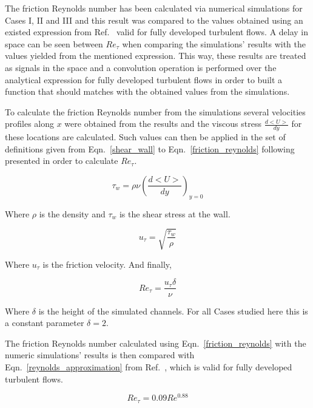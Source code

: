 \documentclass[twocolumn,10pt]{asme2e}
\begin{document}
The friction Reynolds number has been calculated via numerical simulations for Cases I, II and III and this result was compared to the values obtained using an existed expression from Ref.~\cite{pope} valid for fully developed turbulent flows. A delay in space can be seen between \(Re_{\tau}\) when comparing the simulations' results with the values yielded from the mentioned expression. This way, these results are treated as signals in the space and a convolution operation is performed over the analytical expression for fully developed turbulent flows in order to built a function that should matches with the obtained values from the simulations.

To calculate the friction Reynolds number from the simulations several velocities profiles along \(x\) were obtained from the results and the viscous stress \(\frac{d<U>}{dy}\) for these locations are calculated. Such values can then be applied in the set of definitions given from Eqn.~\ref{shear_wall} to Eqn.~\ref{friction_reynolds} following presented in order to calculate \(Re_{\tau}\).

\begin{equation}
{\tau}_w = \rho\nu\left(\frac{d<U>}{dy}\right)_{y=0}
\label{shear_wall}
\end{equation}

Where \(\rho\) is the density and \({\tau}_w\)  is the shear stress at the wall.

\begin{equation}
u_{\tau} = \sqrt{\frac{{\tau}_w}{\rho}}
\label{u_t}
\end{equation}

Where \(u_{\tau}\) is the friction velocity. And finally,

\begin{equation}
Re_{\tau} = \frac{u_{\tau}\delta}{\nu}
\label{friction_reynolds}
\end{equation}

Where \(\delta\) is the height of the simulated channels. For all Cases studied here this is a constant parameter \(\delta=2\).

The friction Reynolds number calculated using Eqn.~\ref{friction_reynolds} with the numeric simulations' results is then compared with Eqn.~\ref{reynolds_approximation} from Ref.~\cite{pope}, which is valid for fully developed turbulent flows.

\begin{equation}
Re_{\tau} = 0.09Re^{0.88}
\label{reynolds_approximation}
\end{equation}
\end{document}
